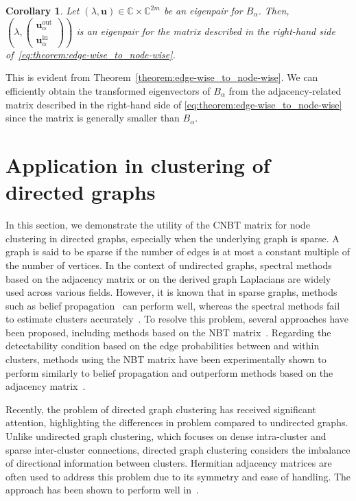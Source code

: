 \documentclass{article}
\theoremstyle{plain}
\newtheorem{corollary}{Corollary}
\begin{document}
\begin{corollary}
	Let $(\lambda, \bm{u}) \in \mathbb{C}\times \mathbb{C}^{2m}$ be an eigenpair for $B_{\alpha}$. Then,
	$(\lambda, \begin{pmatrix} \bm{u}_{\alpha}^{\text{out}} \\ \bm{u}_{\alpha}^{\text{in}} \end{pmatrix})$ is an eigenpair for the matrix
	described in the right-hand side of~\eqref{eq:theorem:edge-wise_to_node-wise}.
\end{corollary}
This is evident from Theorem~\ref{theorem:edge-wise_to_node-wise}.
We can efficiently obtain the transformed eigenvectors of $B_{\alpha}$ from the adjacency-related matrix
described in the right-hand side of \eqref{eq:theorem:edge-wise_to_node-wise} since the matrix is generally smaller than $B_{\alpha}$.


\section{Application in clustering of directed graphs}\label{section:application}

In this section, we demonstrate the utility of the CNBT matrix for node clustering in directed graphs,
especially when the underlying graph is sparse.
A graph is said to be sparse if the number of edges is at most a constant multiple of the number of vertices.
In the context of undirected graphs,
spectral methods based on the adjacency matrix or on the derived graph Laplacians are widely used across various fields.
However, it is known that in sparse graphs, methods such as belief propagation~\citep{Yedidia2003-nz} can perform well,
whereas the spectral methods fail to estimate clusters accurately~\citep{Decelle2011-ir}.
To resolve this problem, several approaches have been proposed, including methods based on the NBT matrix~\citep{Krzakala2013-up,Saade2014-vg,Newman2013-zc}.
Regarding the detectability condition based on the edge probabilities between and within clusters,
methods using the NBT matrix have been experimentally shown to perform similarly to belief propagation and outperform methods based on the adjacency matrix~\citep{Krzakala2013-up}.

Recently, the problem of directed graph clustering has received significant attention,
highlighting the differences in problem compared to undirected graphs.
Unlike undirected graph clustering, which focuses on dense intra-cluster and sparse inter-cluster connections,
directed graph clustering considers the imbalance of directional information between clusters.
Hermitian adjacency matrices are often used to address this problem due to its symmetry and ease of handling.
The approach has been shown to perform well in~\citep{Cucuringu2020-de,Laenen2020-ft,Martin2024-en}.
\end{document}
